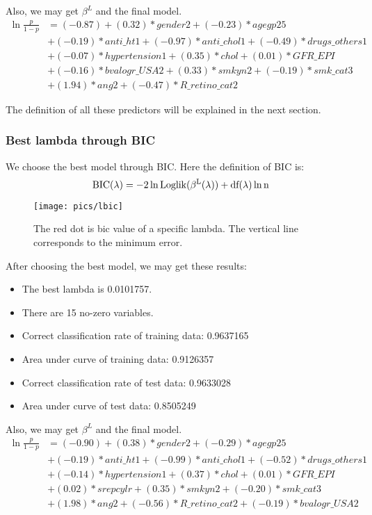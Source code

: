 \documentclass[]{article}
\begin{document}
Also, we may get $ \beta^L $ and the final model.
\begin{align*}
\ln\frac{p}{1-p}&=(-0.87) + ( 0.32)*gender2 + (-0.23)*agegp25\\ &+ (-0.19)*anti\_ht1 + (-0.97)*anti\_chol1 + (-0.49)*drugs\_others1 \\ &+ (-0.07)*hypertension1+ ( 0.35)*chol + ( 0.01)*GFR\_EPI \\&+ (-0.16)*bvalogr\_USA2 + ( 0.33)*smkyn2 + (-0.19)*smk\_cat3 \\&+ ( 1.94)*ang2 + (-0.47)*R\_retino\_cat2
\end{align*}

The definition of all these predictors will be explained in the next section.

\subsubsection{Best lambda through BIC}
We choose the best model through BIC. Here the definition of BIC is:
\begin{equation}
\rm BIC(\lambda)=-2\ln \rm Loglik(\beta^L(\lambda))+\rm df(\lambda) \ln n
\end{equation}

\begin{figure}[H]
	\centering
	\texttt{[image: pics/lbic]}
	\caption{The red dot is bic value of a specific lambda. The vertical line corresponds to the minimum error.\label{fig=lbic}}
\end{figure}

After choosing the best model, we may get these results:
\begin{itemize}
	\item The best lambda is 0.0101757.
	\item There are 15 no-zero variables.
	\item Correct classification rate of training data: 0.9637165
	\item Area under curve of training data: 0.9126357
	\item Correct classification rate of test data: 0.9633028
	\item Area under curve of test data: 0.8505249
\end{itemize}

Also, we may get $ \beta^L $ and the final model.
\begin{align*}
\ln\frac{p}{1-p}&=(-0.90) + ( 0.38)*gender2 + (-0.29)*agegp25\\ &+
 (-0.19)*anti\_ht1 + (-0.99)*anti\_chol1 + (-0.52)*drugs\_others1 \\ &+ (-0.14)*hypertension1 + ( 0.37)*chol + ( 0.01)*GFR\_EPI  \\&+  
( 0.02)*srepcylr + ( 0.35)*smkyn2 + (-0.20)*smk\_cat3 \\&+ 
( 1.98)*ang2 + (-0.56)*R\_retino\_cat2+ (-0.19)*bvalogr\_USA2
\end{align*}
\end{document}
